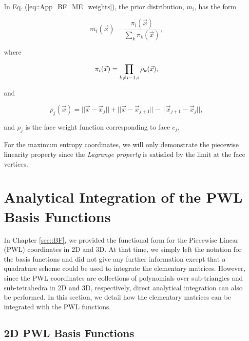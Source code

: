\noindent In Eq. (\ref{eq::App_BF_ME_weights}), the prior distribution, $m_i$, has the form 

\begin{equation}
\label{eq::BF_ME_prior_funcs}
 m_i(\vec{x}) = \frac{\pi_i (\vec{x}) }{\sum_{k} \pi_k (\vec{x})},
\end{equation}

\noindent where

\begin{equation}
\label{eq::BF_ME_prior_products}
\pi_i (\vec{x}) = \prod\displaylimits_{k \neq i-1, i} \rho_k (\vec{x}),
\end{equation}

\noindent and

\begin{equation}
\label{eq::BF_ME_face_funcs}
\rho_j (\vec{x}) = || \vec{x} - \vec{x}_j || + || \vec{x} - \vec{x}_{j+1} || - || \vec{x}_{j+1} - \vec{x}_j || ,
\end{equation}

\noindent and $\rho_j$ is the face weight function corresponding to face $e_j$. 

For the maximum entropy coordinates, we will only demonstrate the piecewise linearity property since the {\em Lagrange property} is satisfied by the limit at the face vertices.



\section{Analytical Integration of the PWL Basis Functions}
\label{sec::appendix_BF_PWLInt}

In Chapter \ref{sec::BF}, we provided the functional form for the Piecewise Linear (PWL) coordinates in 2D and 3D. At that time, we simply left the notation for the basis functions and did not give any further information except that a quadrature scheme could be used to integrate the elementary matrices. However, since the PWL coordinates are collections of polynomials over sub-triangles and sub-tetrahedra in 2D and 3D, respectively, direct analytical integration can also be performed. In this section, we detail how the elementary matrices can be integrated with the PWL functions.

\subsection{2D PWL Basis Functions}
\label{sec::appendix_BF_PWLInt_2D}

